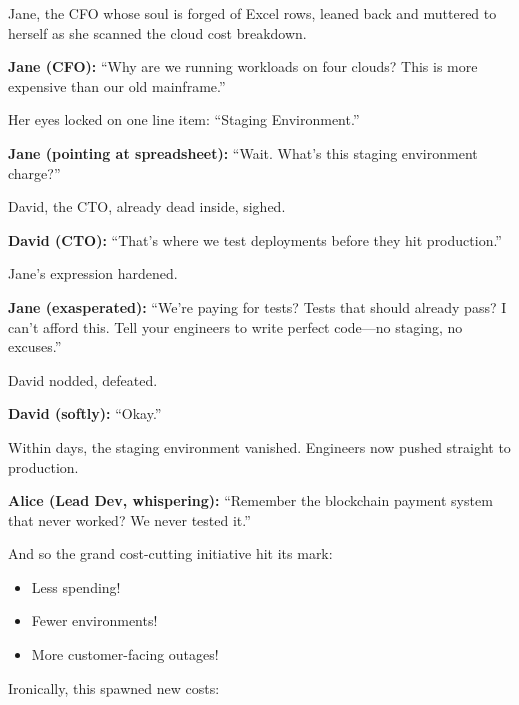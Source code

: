 Jane, the CFO whose soul is forged of Excel rows, leaned back and muttered  
to herself as she scanned the cloud cost breakdown.

\medskip

\textbf{Jane (CFO):} “Why are we running workloads on four clouds? This is  
more expensive than our old mainframe.”

\medskip

Her eyes locked on one line item: “Staging Environment.”

\medskip

\textbf{Jane (pointing at spreadsheet):} “Wait. What’s this staging  
environment charge?”

\medskip

David, the CTO, already dead inside, sighed.

\medskip

\textbf{David (CTO):} “That’s where we test deployments before they hit  
production.”

\medskip

Jane’s expression hardened.

\medskip

\textbf{Jane (exasperated):} “We’re paying for tests? Tests that should  
already pass? I can’t afford this. Tell your engineers to write perfect  
code—no staging, no excuses.”

\medskip

David nodded, defeated.

\medskip

\textbf{David (softly):} “Okay.”

\medskip

Within days, the staging environment vanished. Engineers now pushed  
straight to production.

\medskip

\textbf{Alice (Lead Dev, whispering):} “Remember the blockchain payment  
system that never worked? We never tested it.”

\medskip

And so the grand cost-cutting initiative hit its mark:

\begin{itemize}
  \item Less spending!
  \item Fewer environments!
  \item More customer-facing outages!
\end{itemize}

\noindent Ironically, this spawned new costs:

